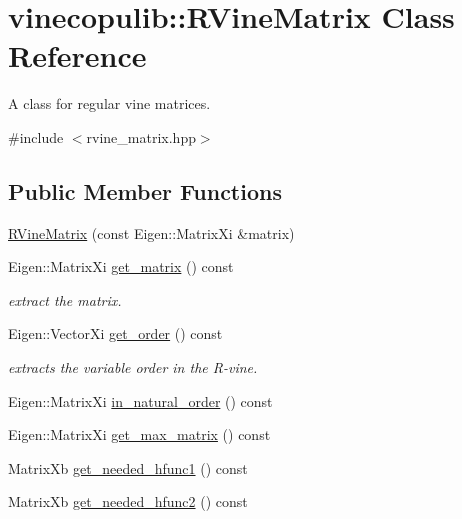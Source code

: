 \hypertarget{classvinecopulib_1_1_r_vine_matrix}{}\section{vinecopulib\+:\+:R\+Vine\+Matrix Class Reference}
\label{classvinecopulib_1_1_r_vine_matrix}


A class for regular vine matrices.  




{\ttfamily \#include $<$rvine\+\_\+matrix.\+hpp$>$}

\subsection*{Public Member Functions}
\begin{DoxyCompactItemize}
\item 
\hyperlink{classvinecopulib_1_1_r_vine_matrix_a5872c479d4a7de9c2ddc64cdb0909ef9}{R\+Vine\+Matrix} (const Eigen\+::\+Matrix\+Xi \&matrix)
\item 
Eigen\+::\+Matrix\+Xi \hyperlink{classvinecopulib_1_1_r_vine_matrix_aef1ea47e9fcbcd32337b2db508b25fdb}{get\+\_\+matrix} () const \hypertarget{classvinecopulib_1_1_r_vine_matrix_aef1ea47e9fcbcd32337b2db508b25fdb}{}\label{classvinecopulib_1_1_r_vine_matrix_aef1ea47e9fcbcd32337b2db508b25fdb}

\begin{DoxyCompactList}\small\item\em extract the matrix. \end{DoxyCompactList}\item 
Eigen\+::\+Vector\+Xi \hyperlink{classvinecopulib_1_1_r_vine_matrix_a8ce7f93504e7c219ca9da89e1d97a34b}{get\+\_\+order} () const \hypertarget{classvinecopulib_1_1_r_vine_matrix_a8ce7f93504e7c219ca9da89e1d97a34b}{}\label{classvinecopulib_1_1_r_vine_matrix_a8ce7f93504e7c219ca9da89e1d97a34b}

\begin{DoxyCompactList}\small\item\em extracts the variable order in the R-\/vine. \end{DoxyCompactList}\item 
Eigen\+::\+Matrix\+Xi \hyperlink{classvinecopulib_1_1_r_vine_matrix_a88673df07f4aae0e0e0a65faff2418b6}{in\+\_\+natural\+\_\+order} () const 
\item 
Eigen\+::\+Matrix\+Xi \hyperlink{classvinecopulib_1_1_r_vine_matrix_a674074d4e248868a01155a25f775ae3a}{get\+\_\+max\+\_\+matrix} () const 
\item 
Matrix\+Xb \hyperlink{classvinecopulib_1_1_r_vine_matrix_a6303fc1f643fdf793c867ca7e08e42bc}{get\+\_\+needed\+\_\+hfunc1} () const 
\item 
Matrix\+Xb \hyperlink{classvinecopulib_1_1_r_vine_matrix_a7ac32cf10a966ba567142e9b36106746}{get\+\_\+needed\+\_\+hfunc2} () const 
\end{DoxyCompactItemize}
